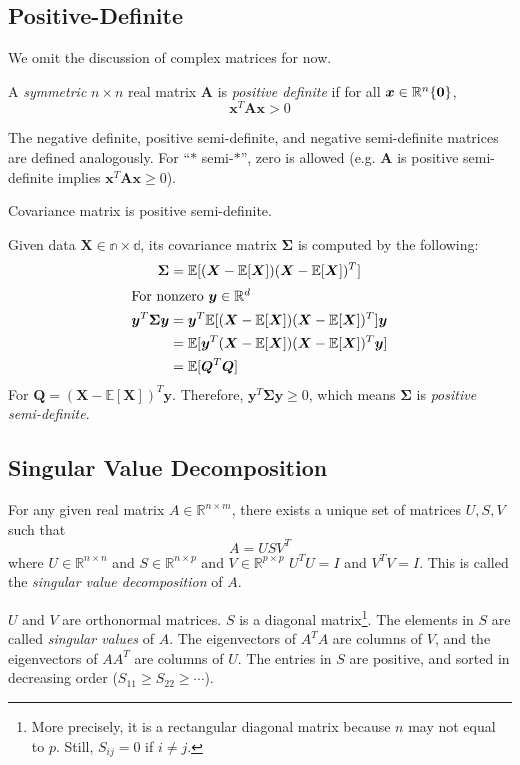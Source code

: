 \subsection{Positive-Definite}
We omit the discussion of complex matrices for now.
\begin{definition}
A \emph{symmetric} $n\times n$ real matrix $\bm{A}$ is \emph{positive definite} if for all $\bm{x}\in\mathbb{R}^n \\ \{\bm{0}\}$, 
\begin{equation}
    \bm{x}^T\bm{Ax} > 0
\end{equation}
\end{definition}
 The negative definite, positive semi-definite, and negative semi-definite matrices are defined analogously. For ``$*$ semi-$*$'', zero is allowed (e.g. $\bm{A}$ is positive semi-definite implies $\bm{x}^T\bm{Ax}\geq 0$).
\begin{theorem}
Covariance matrix is positive semi-definite.
\end{theorem}
\noindent Given data $\bm{X}\in\mathbb{n\times d}$, its covariance matrix $\bm{\Sigma}$ is computed by the following:
\begin{align}
    \bm{\Sigma}&=\mathbb{E}[(\bm{X}-\mathbb{E}[\bm{X}])(\bm{X}-\mathbb{E}[\bm{X}])^T]\\
    \intertext{For nonzero $\bm{y}\in\mathbb{R}^d$}
    \bm{y}^T\bm{\Sigma y} &=  \bm{y}^T\mathbb{E}[(\bm{X}-\mathbb{E}[\bm{X}])(\bm{X}-\mathbb{E}[\bm{X}])^T]\bm{y}\\
    &=  \mathbb{E}[\bm{y}^T(\bm{X}-\mathbb{E}[\bm{X}])(\bm{X}-\mathbb{E}[\bm{X}])^T\bm{y}]\\
    &=  \mathbb{E}[\bm{Q}^T\bm{Q}]
\end{align}
For $\bm{Q}=(\bm{X}-\mathbb{E}[\bm{X}])^T\bm{y}$. Therefore, $\bm{y}^T\bm{\Sigma y}\geq 0$, which means $\bm{\Sigma}$ is \emph{positive semi-definite}.


\subsection{Singular Value Decomposition}
\begin{theorem}
  For any given real matrix $A\in\mathbb{R}^{n\times m}$, there exists a unique set of matrices $U, S, V$ such that
  \begin{equation}
    A = USV^T
  \end{equation}
  where $U\in\mathbb{R}^{n\times n}$ and $S\in\mathbb{R}^{n\times p}$ and $V\in\mathbb{R}^{p\times p}$ $U^TU=I$ and $V^TV=I$. This is called the \emph{singular value decomposition} of $A$.
\end{theorem}
$U$ and $V$ are orthonormal matrices. $S$ is a diagonal matrix\footnote{More precisely, it is a rectangular diagonal matrix because $n$ may not equal to $p$. Still, $S_{ij}=0$ if $i\neq j$.}. The elements in $S$ are called \emph{singular values} of $A$. The eigenvectors of $A^TA$ are columns of $V$, and the eigenvectors of $AA^T$ are columns of $U$. The entries in $S$ are positive, and sorted in decreasing order ($S_{11}\geq S_{22}\geq\cdots$).

